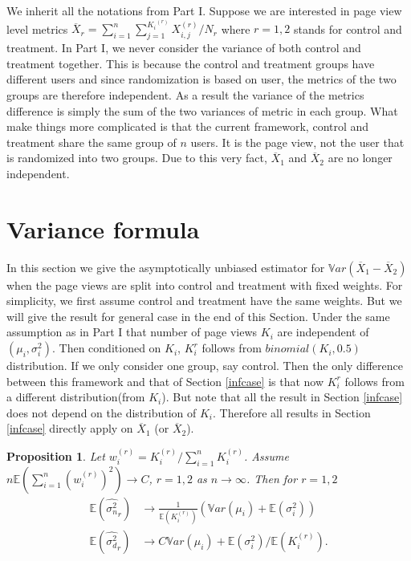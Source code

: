 \documentclass[12pt,letterpaper]{article}
\newcommand{\wht}{\widehat}
\newcommand{\var}{\ensuremath{\mathbb Var}}
\newcommand{\bbe}{\mathbb{E}}
\newcommand{\xbar}{\overline{X}}
\newcommand{\naiveest}{\wht{\sigma^2_n}}
\newcommand{\deltaest}{\wht{\sigma^2_d}}
\newtheorem{prop}[thm]{Proposition}
\begin{document}
We inherit all the notations from Part I. Suppose we are interested in page view level metrics $\xbar_r = \sum_{i=1}^n \sum_{j=1}^{{K_i}^{(r)}}X_{i,j}^{(r)}/N_r$ where $r=1,2$ stands for control and treatment. In Part I, we never consider the variance of both control and treatment together. This is because the control and treatment groups have different users and since randomization is based on user, the metrics of the two groups are therefore independent. As a result the variance of the metrics difference is simply the sum of the two variances of metric in each group.  What make things more complicated is that the current framework, control and treatment share the same group of $n$ users. It is the page view, not the user that is randomized into two groups. Due to this very fact, $\xbar_1$ and $\xbar_2$ are no longer independent. 


\section{Variance formula}
In this section we give the asymptotically unbiased estimator for $\var (\xbar_1-\xbar_2)$ when the page views are split into control and treatment with fixed weights. For simplicity, we first assume control and treatment have the same weights. But we will give the result for general case in the end of this Section. Under the same assumption as in Part I that number of page views $K_i$ are independent of $(\mu_i,\sigma_i^2)$. Then conditioned on $K_i$, $K_i^{r}$ follows from $binomial(K_i, 0.5)$ distribution. If we only consider one group, say control. Then the only difference between this framework and that of Section \ref{infcase} is that now $K_i^{r}$ follows from a different distribution(from $K_i$). But note that all the result in Section \ref{infcase} does not depend on the distribution of $K_i$. Therefore all results in Section \ref{infcase} directly apply on $\xbar_1$ (or $\xbar_2$). 

\begin{prop}\label{p_prop1}
Let $w_i^{(r)}=K_i^{(r)}/\sum_{i=1}^{n} K_i^{(r)} $. Assume $n\bbe (\sum_{i=1}^n {(w_i^{(r)})}^2)\to C$, $r=1,2$ as $n\to \infty$. Then for $r=1,2$
\begin{align}
\bbe(\naiveest_r) &\to  \frac{1}{\bbe(K_i^{(r)})} (\var(\mu_i)+\bbe(\sigma_i^2)) \label{p_naive}\\
\bbe (\deltaest_r) &\to C \var(\mu_i) + \bbe(\sigma^2_i)/\bbe (K_i^{(r)}) \label{p_delta}.
\end{align}
\end{prop}
\end{document}
